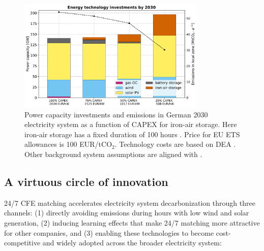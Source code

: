 \documentclass[pdflatex,sn-basic, Numbered]{sn-jnl}%
\theoremstyle{thmstyleone}%
\theoremstyle{thmstyletwo}%
\theoremstyle{thmstylethree}%
\begin{document}
\begin{figure}[htbp]
    \centering
    \includegraphics[width=0.8\textwidth]{images/dashboard_3.pdf}
    \caption{Power capacity investments and emissions in German 2030 electricity system as a function of CAPEX for iron-air storage. Here iron-air storage has a fixed duration of 100 hours \cite{FormEnergyLatest2024}. Price for EU ETS allowances is 100 EUR/tCO$_2$. Technology costs are based on DEA \cite{DEA-technologydata}. Other background system assumptions are aligned with \citet{riepin-zenodo-systemlevel247}.}\label{fig:impact}
    \captionsetup{width=0.3\textwidth}  %
\end{figure}


\subsection*{A virtuous circle of innovation}\label{sec5}

24/7 CFE matching accelerates electricity system decarbonization through three channels: (1) directly avoiding emissions during hours with low wind and solar generation, (2) inducing learning effects that make 24/7 matching more attractive for other companies, and (3) enabling these technologies to become cost-competitive and widely adopted across the broader electricity system:
\end{document}
